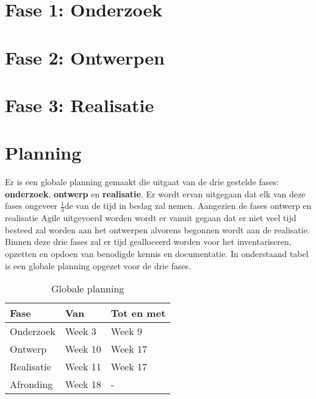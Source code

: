 \newpage
\section{Fase 1: Onderzoek}



\section{Fase 2: Ontwerpen}


\section{Fase 3: Realisatie}



\clearpage
\section{Planning}
Er is een globale planning gemaakt die uitgaat van de drie gestelde fases: \textbf{onderzoek}, \textbf{ontwerp} en \textbf{realisatie}. Er wordt ervan uitgegaan dat elk van deze fases ongeveer \( \frac{1}{3} \)de van de tijd in beslag zal nemen. Aangezien de fases ontwerp en realisatie Agile uitgevoerd worden wordt er vanuit gegaan dat er niet veel tijd besteed zal worden aan het ontwerpen alvorens begonnen wordt aan de realisatie. Binnen deze drie fases zal er tijd gealloceerd worden voor het inventariseren, opzetten en opdoen van benodigde kennis en documentatie. In onderstaand tabel is een globale planning opgezet voor de drie fases.

\begin{table}[ht]
  \begin{tabular}{|p{6cm}|p{4cm}|p{4cm}|}
    \hline
    \textbf{Fase} & \textbf{Van} & \textbf{Tot en met} \\
    \hline
    Onderzoek & Week 3 & Week 9 \\
    \hline
    Ontwerp & Week 10 & Week 17 \\
    \hline
    Realisatie & Week 11 & Week 17 \\
    \hline
    Afronding & Week 18 & - \\
    \hline
  \end{tabular}
  \caption{Globale planning}
  \label{planning}
\end{table}

